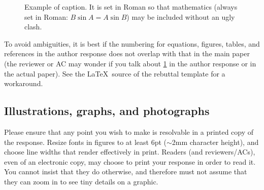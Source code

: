 \documentclass[10pt,twocolumn,letterpaper]{article}
\begin{document}
\begin{figure}[t]
  \centering
  \fbox{\rule{0pt}{0.5in} \rule{0.9\linewidth}{0pt}}
   \caption{Example of caption.  It is set in Roman so that mathematics
   (always set in Roman: $B \sin A = A \sin B$) may be included without an
   ugly clash.}
   \label{fig:onecol}
\end{figure}

To avoid ambiguities, it is best if the numbering for equations, figures, tables, and references in the author response does not overlap with that in the main paper (the reviewer or AC may wonder if you talk about \cref{fig:onecol} in the author response or in the actual paper).
See the \LaTeX\ source of the rebuttal template for a workaround.


\subsection{Illustrations, graphs, and photographs}

Please ensure that any point you wish to make is resolvable in a printed copy of the response.
Resize fonts in figures to at least 6\:pt ($\sim$2\:mm character height), and choose line widths that render effectively in print.
Readers (and reviewers/ACs), even of an electronic copy, may choose to print your response in order to read it.
You cannot insist that they do otherwise, and therefore must not assume that they can zoom in to see tiny details on a graphic.



{
    \small
    
    
}
\end{document}
